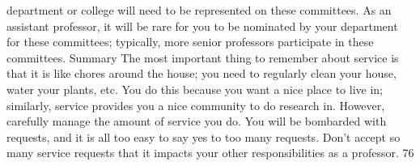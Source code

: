\documentclass[oneside,11pt]{memoir}
\begin{document}
department or college will need to be represented on these committees. As an assistant
professor, it will be rare for you to be nominated by your department for these committees;
typically, more senior professors participate in these committees.
Summary
The most important thing to remember about service is that it is like chores around the house;
you need to regularly clean your house, water your plants, etc. You do this because you want a
nice place to live in; similarly, service provides you a nice community to do research in. However,
carefully manage the amount of service you do. You will be bombarded with requests, and it is
all too easy to say yes to too many requests. Don’t accept so many service requests that it
impacts your other responsibilities as a professor.
76






\end{document}
